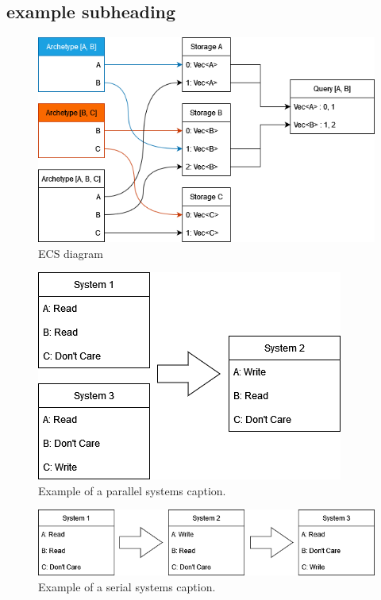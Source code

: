 \documentclass[conference]{IEEEtran}
\begin{document}
\subsection{example subheading}

\begin{figure}[htbp]
\centerline{\includegraphics[scale=.4]{ECS_Diagrams.png}}
\caption{ECS diagram}
\label{ECS diagram label}
\end{figure}
\begin{figure}[htbp]
\centerline{\includegraphics[scale=.4]{parallel_systems.png}}
\caption{Example of a parallel systems caption.}
\label{label for parallel systems}
\end{figure}
\begin{figure}[htbp]
\centerline{\includegraphics[scale=.4]{serial_systems.png}}
\caption{Example of a serial systems caption.}
\label{label for serial systems}
\end{figure}
\end{document}
